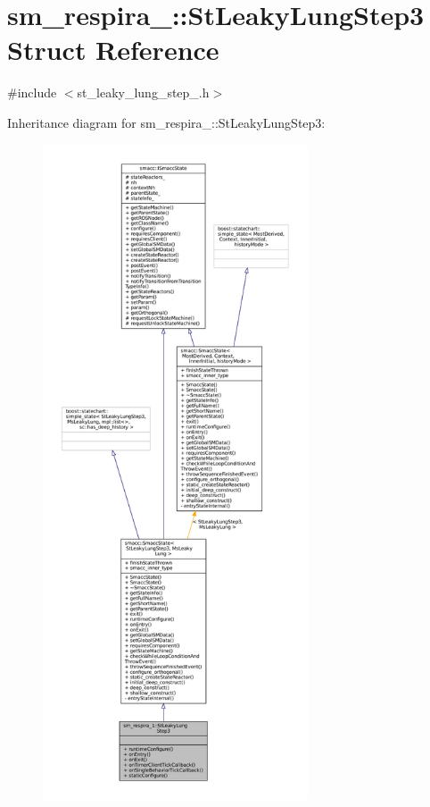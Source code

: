 \hypertarget{structsm__respira__1_1_1StLeakyLungStep3}{}\section{sm\+\_\+respira\+\_\+:\+:St\+Leaky\+Lung\+Step3 Struct Reference}
\label{structsm__respira__1_1_1StLeakyLungStep3}


{\ttfamily \#include $<$st\+\_\+leaky\+\_\+lung\+\_\+step\+\_.\+h$>$}



Inheritance diagram for sm\+\_\+respira\+\_\+:\+:St\+Leaky\+Lung\+Step3\+:
\nopagebreak
\begin{figure}[H]
\begin{center}
\leavevmode
\includegraphics[height=550pt]{structsm__respira__1_1_1StLeakyLungStep3__inherit__graph}
\end{center}
\end{figure}


